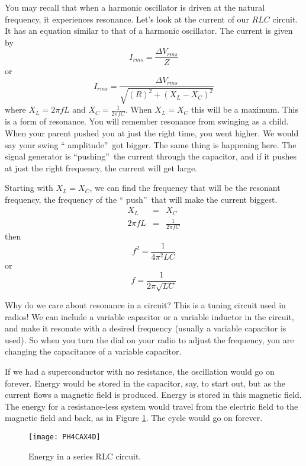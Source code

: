 You may recall that when a harmonic oscillator is
driven at the natural frequency, it experiences resonance. 
Let's look at the current
of our $RLC$ circuit. It has an equation similar to that of 
a harmonic oscillator.
The current is given by%
\begin{equation*}
I_{rms}=\frac{\Delta V_{rms}}{Z}
\end{equation*}%
or 
\begin{equation*}
I_{rms}=\frac{\Delta V_{rms}}{\sqrt{\left( R\right) ^{2}+\left(
X_{L}-X_{C}\right) ^{2}}}
\end{equation*}%
where $X_{L}=2\pi fL$ and $X_{C}=\frac{1}{2\pi fC}.$ When $X_{L}=X_{C}$ this
will be a maximum. This is a form of resonance. You will remember resonance
from swinging as a child. When your parent pushed you at just the right
time, you went higher. We would say your swing \textquotedblleft
amplitude\textquotedblright\ got bigger. The same thing is happening here.
The signal generator is \textquotedblleft pushing\textquotedblright\ the
current through the capacitor, and if it pushes at just the right frequency, the
current will get large.

Starting with $X_{L}=X_{C}$, we can find the frequency that will be the
resonant frequency, the frequency of the \textquotedblleft
push\textquotedblright\ that will make the current biggest.%
\begin{eqnarray*}
X_{L} &=&X_{C} \\
2\pi fL &=&\frac{1}{2\pi fC}
\end{eqnarray*}%
then%
\begin{equation*}
f^{2}=\frac{1}{4\pi ^{2}LC}
\end{equation*}%
or%
\begin{equation}
f=\frac{1}{2\pi \sqrt{LC}}  \label{Resonance Frequecy}
\end{equation}

Why do we care about resonance in a circuit? 
This is a tuning circuit used in radios! We can include a
variable capacitor or a variable inductor in the circuit, and make it
resonate with a desired frequency (usually a variable capacitor is used). So
when you turn the dial on your radio to adjust the frequency, you are
changing the capacitance of a variable capacitor.

If we had a superconductor with no resistance, the oscillation would go on
forever. Energy would be stored in the capacitor, say, to start out, but as
the current flows a magnetic field is produced. Energy is stored in this
magnetic field. The energy for a resistance-less system would travel from
the electric field to the magnetic field and back, as in 
Figure \ref{fig:rlc_energy}.
The cycle would go on forever.
\begin{figure}[htbp!]
	\centering
\texttt{[image: PH4CAX4D]}
	\caption{Energy in a series RLC circuit.}
	\label{fig:rlc_energy}
\end{figure}

